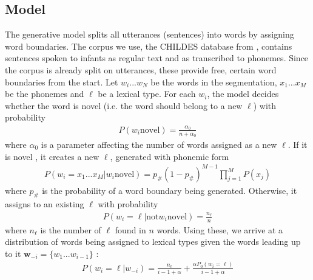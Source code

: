 \documentclass[11pt]{article}
\begin{document}
\subsection{Model}
The generative model splits all utterances (sentences) into words by assigning word boundaries. The corpus we use, the CHILDES database from \cite{mac1985}, contains sentences spoken to infants as regular text and as transcribed to phonemes. Since the corpus is already split on utterances, these provide free, certain word boundaries from the start. Let $w_i ... w_N$ be the words in the segmentation, $x_1 ... x_M$ be the phonemes and $\ell$ be a lexical type. For each $w_i$, the model decides whether the word is novel (i.e. the word should belong to a new $\ell$) with probability
\begin{align}
P(w_i \text{novel}) = \frac{\alpha_0}{n+\alpha_0}
\end{align}
where $\alpha_0$ is a parameter affecting the number of words assigned as a new $\ell$. If it is novel , it creates a new $\ell$, generated with phonemic form
\begin{align}
P(w_i = x_1 ... x_M | w_i  \text{novel}) = p_\# (1-p_\#)^{M-1} \prod_{j=1}^M P(x_j)
\end{align}
where $p_\#$ is the probability of a word boundary being generated. Otherwise, it assigns to an existing $\ell$ with probability
\begin{align}
P(w_i = \ell | \text{not} w_i \text{novel}) = \frac{n_\ell}{n}
\end{align}
where $n_\ell$ is the number of $\ell$ found in $n$ words. Using these, we arrive at a distribution of words being assigned to lexical types given the words leading up to it $\textbf{w}_{-i} = \{ w_1 ... w_{i-1}\}$ :
\begin{align}
P(w_i = \ell | w_{-i}) = \frac{n_\ell}{i-1+\alpha} + \frac{\alpha P_0 (w_i = \ell )}{i - 1 + \alpha}
\end{align}
\end{document}
